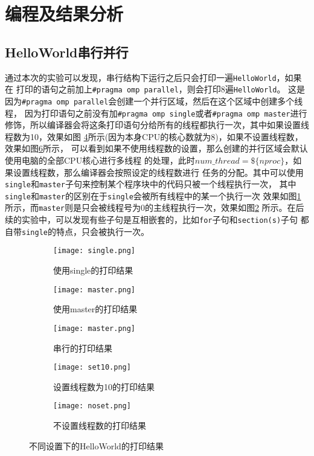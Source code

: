 \documentclass{article}
\begin{document}
\section{编程及结果分析}
\subsection{HelloWorld串行并行}
\indent 通过本次的实验可以发现，串行结构下运行之后只会打印一遍\texttt{HelloWorld}，如果在
打印的语句之前加上\texttt{\#pragma omp parallel}，则会打印8遍\texttt{HelloWorld}。
这是因为\texttt{\#pragma omp parallel}会创建一个并行区域，然后在这个区域中创建多个线程，
因为打印语句之前没有加\texttt{\#pragma omp single}或者\texttt{\#pragma omp master}进行
修饰，所以编译器会将这条打印语句分给所有的线程都执行一次，其中如果设置线程数为10，效果如图
\ref{fig:4}所示(因为本身CPU的核心数就为8)，如果不设置线程数，效果如图\ref{fig:5}所示，
可以看到如果不使用线程数的设置，那么创建的并行区域会默认使用电脑的全部CPU核心进行多线程
的处理，此时$num\_thread=\$\{nproc\}$，如果设置线程数，那么编译器会按照设定的线程数进行
任务的分配。其中可以使用\texttt{single}和\texttt{master}子句来控制某个程序块中的代码只被一个线程执行一次，
其中\texttt{single}和\texttt{master}的区别在于\texttt{single}会被所有线程中的某一个执行一次
效果如图\ref{fig:1}所示，而\texttt{master}则是只会被线程号为0的主线程执行一次，效果如图\ref{fig:2}
所示。在后续的实验中，可以发现有些子句是互相嵌套的，比如\texttt{for}子句和\texttt{section(s)}子句
都自带\texttt{single}的特点，只会被执行一次。
\begin{figure}[H]
    \centering
    \begin{subfigure}[b]{0.3\textwidth}
        \centering
        \texttt{[image: single.png]}
        \caption{使用single的打印结果}
        \label{fig:1}
    \end{subfigure}
    \hfill
    \begin{subfigure}[b]{0.3\textwidth}
        \centering
        \texttt{[image: master.png]}
        \caption{使用master的打印结果}
        \label{fig:2}
    \end{subfigure}
    \hfill
    \begin{subfigure}[b]{0.3\textwidth}
        \centering
        \texttt{[image: master.png]}
        \caption{串行的打印结果}
        \label{fig:3}
    \end{subfigure}

    \begin{subfigure}[b]{0.45\textwidth}
        \centering
        \texttt{[image: set10.png]}
        \caption{设置线程数为10的打印结果}
        \label{fig:4}
    \end{subfigure}
    \hfill
    \begin{subfigure}[b]{0.45\textwidth}
        \centering
        \texttt{[image: noset.png]}
        \caption{不设置线程数的打印结果}
        \label{fig:5}
    \end{subfigure}
    \caption{不同设置下的HelloWorld的打印结果}
\end{figure}
\end{document}
